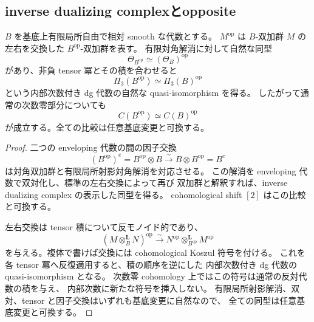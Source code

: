 \subsection{inverse dualizing complexとopposite}

\begin{lemma}[Serre完成の反対代数への適合性]
\label{lem:qa-serre-completion-opposite}
$B$ を基底上有限局所自由で相対 smooth な代数とする。
$M^{\mathrm{op}}$ は $B$-双加群 $M$ の左右を交換した $B^{\mathrm{op}}$-双加群を表す。
有限対角解消に対して自然な同型
\[
 \Theta_{B^{\mathrm{op}}}\simeq(\Theta_B)^{\mathrm{op}}
\]
があり、非負 tensor 冪とその積を合わせると
\[
 \Pi_3(B^{\mathrm{op}})\simeq\Pi_3(B)^{\mathrm{op}}
\]
という内部次数付き dg 代数の自然な quasi-isomorphism を得る。
したがって通常の次数零部分についても
\[
 C(B^{\mathrm{op}})\simeq C(B)^{\mathrm{op}}
\]
が成立する。全ての比較は任意基底変更と可換する。
\end{lemma}
\begin{proof}
二つの enveloping 代数の間の因子交換
\[
 (B^{\mathrm{op}})^e=B^{\mathrm{op}}\otimes B
   \xrightarrow{\sim}B\otimes B^{\mathrm{op}}=B^e
\]
は対角双加群と有限局所射影対角解消を対応させる。
この解消を enveloping 代数で双対化し、標準の左右交換によって再び
双加群と解釈すれば、inverse dualizing complex の表示した同型を得る。
cohomological shift $[2]$ はこの比較と可換する。

左右交換は tensor 積について反モノイド的であり、
\[
 (M\otimes_B^{\mathbf L}N)^{\mathrm{op}}
 \xrightarrow{\sim}
 N^{\mathrm{op}}\otimes_{B^{\mathrm{op}}}^{\mathbf L}M^{\mathrm{op}}
\]
を与える。複体で書けば交換には cohomological Koszul 符号を付ける。
これを各 tensor 冪へ反復適用すると、積の順序を逆にした
内部次数付き dg 代数の quasi-isomorphism となる。
次数零 cohomology 上ではこの符号は通常の反対代数の積を与え、
内部次数に新たな符号を挿入しない。
有限局所射影解消、双対、tensor と因子交換はいずれも基底変更に自然なので、
全ての同型は任意基底変更と可換する。
\end{proof}

